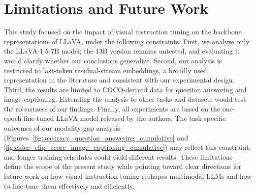 \section{Limitations and Future Work}

This study focused on the impact of visual instruction tuning on the backbone representations of LLaVA, under the following constraints. First, we analyze only the LLaVA-1.5-7B model; the 13B version remains untested, and evaluating it would clarify whether our conclusions generalize. Second, our analysis is restricted to last-token residual-stream embeddings, a broadly used representation in the literature and consistent with our experimental design. Third, the results are limited to COCO-derived data for question answering and image captioning. Extending the analysis to other tasks and datasets would test the robustness of our findings. Finally, all experiments are based on the one-epoch fine-tuned LLaVA model released by the authors. The task-specific outcomes of our modality gap analysis (Figures~\ref{fig:accuracy_question_answering_cumulative} and \ref{fig:cider_clip_score_image_captioning_cumulative}) may reflect this constraint, and longer training schedules could yield different results. These limitations define the scope of the present study while pointing toward clear directions for future work on how visual instruction tuning reshapes multimodal LLMs and how to fine-tune them effectively and efficiently.
